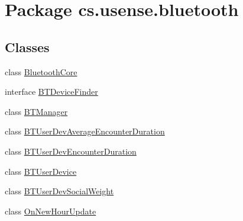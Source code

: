 \hypertarget{namespacecs_1_1usense_1_1bluetooth}{}\section{Package cs.\+usense.\+bluetooth}
\label{namespacecs_1_1usense_1_1bluetooth}
\subsection*{Classes}
\begin{DoxyCompactItemize}
\item 
class \hyperlink{classcs_1_1usense_1_1bluetooth_1_1_bluetooth_core}{Bluetooth\+Core}
\item 
interface \hyperlink{interfacecs_1_1usense_1_1bluetooth_1_1_b_t_device_finder}{B\+T\+Device\+Finder}
\item 
class \hyperlink{classcs_1_1usense_1_1bluetooth_1_1_b_t_manager}{B\+T\+Manager}
\item 
class \hyperlink{classcs_1_1usense_1_1bluetooth_1_1_b_t_user_dev_average_encounter_duration}{B\+T\+User\+Dev\+Average\+Encounter\+Duration}
\item 
class \hyperlink{classcs_1_1usense_1_1bluetooth_1_1_b_t_user_dev_encounter_duration}{B\+T\+User\+Dev\+Encounter\+Duration}
\item 
class \hyperlink{classcs_1_1usense_1_1bluetooth_1_1_b_t_user_device}{B\+T\+User\+Device}
\item 
class \hyperlink{classcs_1_1usense_1_1bluetooth_1_1_b_t_user_dev_social_weight}{B\+T\+User\+Dev\+Social\+Weight}
\item 
class \hyperlink{classcs_1_1usense_1_1bluetooth_1_1_on_new_hour_update}{On\+New\+Hour\+Update}
\end{DoxyCompactItemize}



